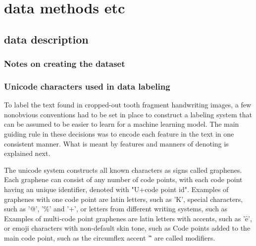 \documentclass{article}
\begin{document}

\section{data methods etc}

\subsection{data description}

\subsubsection{Notes on creating the dataset}

\subsubsection{Unicode characters used in data labeling}


To label the text found in cropped-out tooth fragment handwriting images, a few nonobvious 
conventions had to be set in place to construct a labeling system that can be assumed to 
be easier to learn for a machine learning model. The main guiding rule in these decisions was 
to encode each feature in the text in one consistent manner. What is meant by features and manners 
of denoting is explained next.

The unicode system \cite{unicode_homepage} constructs all known characters as signs called graphenes.
Each graphene can consist of any number of code points, with each code point having an unique identifier, denoted with "U+code point id".
Examples of graphenes with one code point are latin letters, such as 'K', special characters, such as '@', '\%' and '+',
or letters from different writing systems, such as %
 Examples of multi-code point graphenes 
are latin letters with accents, such as '$\hat{\text{e}}$', or emoji characters with non-default skin tone, such as %
Code points added to the main code point, such as the circumflex accent '\^ ' are called modifiers.
\end{document}
